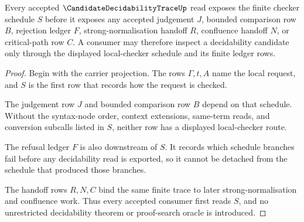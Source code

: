 \begin{theorem}
\label{thm:candidate-decidability-trace-checker-schedule-precedence}
Every accepted $\CandidateDecidabilityTraceUp$ read exposes the finite checker schedule $S$ before it exposes any accepted judgement $J$, bounded comparison row $B$, rejection ledger $F$, strong-normalisation handoff $R$, confluence handoff $N$, or critical-path row $C$. A consumer may therefore inspect a decidability candidate only through the displayed local-checker schedule and its finite ledger rows.
\end{theorem}
\begin{proof}
Begin with the carrier projection. The rows $\Gamma,t,A$ name the local request, and $S$ is the first row that records how the request is checked.

The judgement row $J$ and bounded comparison row $B$ depend on that schedule. Without the syntax-node order, context extensions, same-term reads, and conversion subcalls listed in $S$, neither row has a displayed local-checker route.

The refusal ledger $F$ is also downstream of $S$. It records which schedule branches fail before any decidability read is exported, so it cannot be detached from the schedule that produced those branches.

The handoff rows $R,N,C$ bind the same finite trace to later strong-normalisation and confluence work. Thus every accepted consumer first reads $S$, and no unrestricted decidability theorem or proof-search oracle is introduced.
\end{proof}





